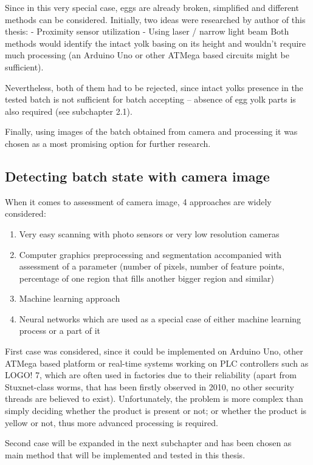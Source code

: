 \documentclass[12pt,twoside,a4paper]{article}
\begin{document}
Since in this very special case, eggs are already broken, simplified and different methods can be considered.
Initially, two ideas were researched by author of this thesis:
- Proximity sensor utilization
- Using laser / narrow light beam 
Both methods would identify the intact yolk basing on its height and wouldn’t require much processing (an Arduino Uno or other ATMega based circuits might be sufficient).

Nevertheless, both of them had to be rejected, since intact yolks presence in the tested batch is not sufficient for batch accepting – absence of egg yolk parts is also required (see subchapter 2.1).

Finally, using images of the batch obtained from camera and processing it was chosen as a most promising option for further research.

\subsection{Detecting batch state with camera image}

When it comes to assessment of camera image, 4 approaches are widely considered:
\begin{enumerate}
\item Very easy scanning with photo sensors or very low resolution cameras
\item Computer graphics preprocessing and segmentation accompanied with assessment of a parameter (number of pixels, number of feature points, percentage of one region that fills another bigger region and similar)
\item Machine learning approach
\item Neural networks which are used as a special case of either machine learning process or a part of it 
\end{enumerate}
First case was considered, since it could be implemented on Arduino Uno, other ATMega based platform or real-time systems working on PLC controllers such as LOGO! 7, which are often used in factories due to their reliability (apart from Stuxnet-class worms, that has been firstly observed in 2010, no other security threads are believed to exist).
Unfortunately, the problem is more complex than simply deciding whether the product is present or not; or whether the product is yellow or not, thus more advanced processing is required.

Second case will be expanded in the next subchapter and has been chosen as main method that will be implemented and tested in this thesis.
\end{document}
